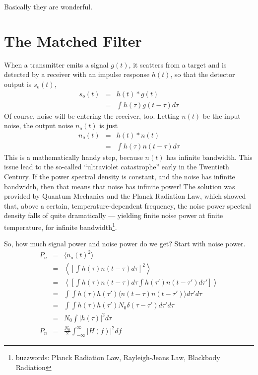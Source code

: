 Basically they are wonderful.


\section{The Matched Filter}

 When a transmitter emits a signal $g(t)$, it scatters from a target
and is detected by a receiver with an impulse response $h(t)$, so that
                   the detector output is $s_o(t)$,
\begin{eqnarray}
s_o(t) &=& h(t)\ast g(t) \\
       &=& \int h(\tau) g(t-\tau) d \tau
\end{eqnarray}
Of course, noise will be entering the receiver, too.  Letting $n(t)$
be the input noise, the output noise $n_o(t)$ is just 
\begin{eqnarray}
n_o(t) &=& h(t)\ast n(t) \\
       &=& \int h(\tau) n(t - \tau) d \tau
\end{eqnarray}
This is a mathematically handy step, because $n(t)$ has infinite
bandwidth.  This issue lead to the so-called ``ultraviolet
catastrophe'' early in the Twentieth Century.  If the power spectral
density is constant, and the noise has infinite bandwidth, then that
means that noise has infinite power!  The solution was provided by
Quantum Mechanics and the Planck Radiation Law, which showed that,
above a certain, temperature-dependent frequency, the noise power
spectral density falls of quite dramatically --- yielding finite noise
power at finite temperature, for infinite
bandwidth\footnote{buzzwords: Planck Radiation Law, Rayleigh-Jeans
  Law, Blackbody Radiation}.

So, how much signal power and noise power do we get?  Start with noise
power. 
\begin{eqnarray}
P_n &=& \langle n_o(t)^2 \rangle \\
    &=& \left\langle \left[ \int h(\tau) n(t-\tau) d\tau
    \right]^2\right\rangle \\
    &=& \left\langle \left[ 
    \int h(\tau) n(t-\tau) d\tau \int h(\tau') n(t-\tau') d\tau'
    \right]\right\rangle \\
    &=& 
    \int \int h(\tau) h(\tau') \langle n(t-\tau) n(t-\tau') \rangle
    d\tau' d\tau \\
    &=& \int \int h(\tau) h(\tau') N_0 \delta(\tau - \tau') d\tau' d\tau \\
    &=& N_0 \int \left| h(\tau)\right|^2 d\tau \\
P_n &=& \frac{N_0}{2} \int_{-\infty}^\infty \left| H(f) \right|^2 df
\end{eqnarray}

